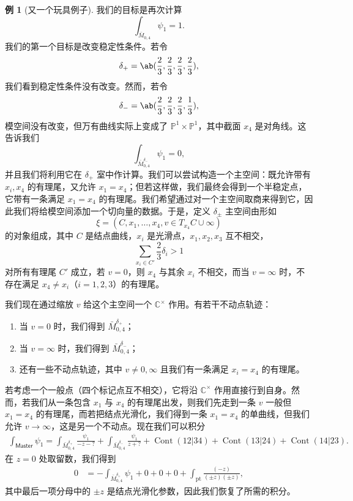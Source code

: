\documentclass{amsart}
\theoremstyle{definition}
\newtheorem{exm}[thm]{例}
\theoremstyle{remark}
\theoremstyle{plain}
\theoremstyle{definition}
\theoremstyle{remark}
\newcommand{\C}{\mathbb{C}}
\renewcommand{\P}{\mathbb{P}}
\newcommand{\mr}[1]{\mathrm{#1}}
\newcommand{\on}[1]{\operatorname{#1}}
\newcommand{\ms}[1]{\mathsf{#1}}
\newcommand{\1}{\mathbf{1}}
\newcommand{\2}{\mathbf{2}}
\newcommand{\3}{\mathbf{3}}
\begin{document}
\begin{exm}[又一个玩具例子]
    我们的目标是再次计算
    \[ \int_{\bar{M}_{0,4}} \psi_1 = 1. \]
    我们的第一个目标是改变稳定性条件。若令
    \[ \delta_+ = \ab(\frac{2}{3}, \frac{2}{3}, \frac{2}{3}, \frac{2}{3}), \]
    我们看到稳定性条件没有改变。然而，若令
    \[ \delta_- = \ab(\frac{2}{3}, \frac{2}{3}, \frac{2}{3}, \frac{1}{3}), \]
    模空间没有改变，但万有曲线实际上变成了 \(\P^1 \times \P^1\)，其中截面 \(x_4\) 是对角线。这告诉我们
    \[ \int_{\bar{M}_{0,4}^{\delta_-}} \psi_1 = 0, \]
    并且我们将利用它在 \(\delta_+\) 室中作计算。我们可以尝试构造一个主空间：既允许带有 \(x_i, x_4\) 的有理尾，又允许 \(x_1 = x_4\)；但若这样做，我们最终会得到一个半稳定点，它带有一条满足 \(x_1 = x_4\) 的有理尾。我们希望通过对一个主空间取商来得到它，因此我们将给模空间添加一个切向量的数据。于是，定义 \(\delta_{\pm}\) 主空间由形如
    \[ \xi = (C, x_1, \ldots, x_4, v \in T_{x_4} C \cup \infty) \]
    的对象组成，其中 \(C\) 是结点曲线，\(x_i\) 是光滑点，\(x_1, x_2, x_3\) 互不相交，
    \[ \sum_{x_i \in C'} \frac{2}{3} \delta_i > 1 \]
    对所有有理尾 \(C'\) 成立，若 \(v = 0\)，则 \(x_4\) 与其余 \(x_i\) 不相交，而当 \(v = \infty\) 时，不存在满足 \(x_4 \neq x_i\)（\(i = 1,2,3\)）的有理尾。 

    我们现在通过缩放 \(v\) 给这个主空间一个 \(\C^{\times}\) 作用。有若干不动点轨迹：
    \begin{enumerate}
        \item 当 \(v = 0\) 时，我们得到 \(\bar{M}_{0,4}^{\delta_+}\)；
        \item 当 \(v = \infty\) 时，我们得到 \(\bar{M}_{0,4}^{\delta_-}\)；
        \item 还有一些不动点轨迹，其中 \(v \neq 0,\infty\) 且我们有一条满足 \(x_i = x_4\) 的有理尾。
    \end{enumerate}

    若考虑一个一般点（四个标记点互不相交），它将沿 \(\C^{\times}\) 作用直接行到自身。然而，若我们从一条包含 \(x_1\) 与 \(x_4\) 的有理尾出发，则我们先走到一条 \(v\) 一般但 \(x_1 = x_4\) 的有理尾，而若把结点光滑化，我们得到一条 \(x_1 = x_4\) 的单曲线，但我们允许 \(v \to \infty\)，这是另一个不动点。现在我们可以积分
    \begin{align*}
        \int_{\ms{Master}} \psi_1 = \int_{\bar{M}_{0,4}^{\delta_+}} \frac{\psi_1}{-z-?} + \int_{\bar{M}_{0,4}^{\delta_-}} \frac{\psi_1}{z+?} + \on{Cont}(12|34) + \on{Cont}(13|24) + \on{Cont}(14|23).
    \end{align*}
    在 \(z = 0\) 处取留数，我们得到
    \begin{align*}
        0 &= - \int_{\bar{M}_{0,4}^{\delta_+}} \psi_1 + 0 + 0 + 0 + \int_{\mr{pt}} \frac{(-z)}{(\pm z)(\pm z)},
    \end{align*}
    其中最后一项分母中的 \(\pm z\) 是结点光滑化参数，因此我们恢复了所需的积分。
\end{exm}
\end{document}
